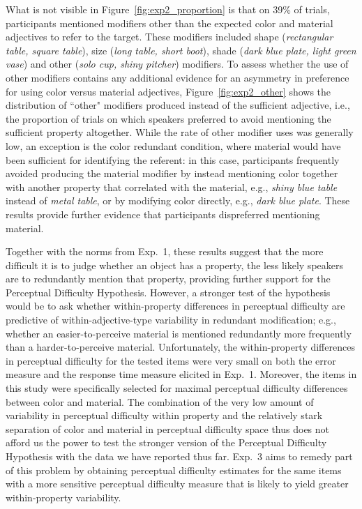 \documentclass[12pt,letterpaper]{article}
\begin{document}
What is not visible in Figure~\ref{fig:exp2_proportion} is that on 39\% of trials, participants mentioned  modifiers other than the expected color and material adjectives to refer to the target. These modifiers included shape (\textit{rectangular table, square table}), size (\textit{long table, short boot}), shade (\textit{dark blue plate, light green vase}) and other (\textit{solo cup, shiny pitcher}) modifiers. To assess whether the use of other modifiers contains any additional evidence for an asymmetry in preference for using color versus material adjectives, Figure~\ref{fig:exp2_other} shows the distribution of ``other" modifiers produced instead of the sufficient adjective, i.e., the proportion of trials on which speakers preferred to avoid mentioning the sufficient property altogether. While the rate of other modifier uses was generally low, an exception is the color redundant condition, where material would have been sufficient for identifying the referent: in this case, participants frequently avoided producing the material modifier by instead mentioning color together with another property that correlated with the material, e.g., \emph{shiny blue table} instead of \emph{metal table}, or by modifying color directly, e.g., \emph{dark blue plate}. These results provide further evidence that participants dispreferred mentioning material.


Together with the norms from Exp.~1, these results suggest that the more difficult it is to judge whether an object has a property, the less likely speakers are to redundantly mention that property, providing further  support for the Perceptual Difficulty Hypothesis. However, a stronger test of the hypothesis would be to ask whether within-property differences in perceptual difficulty are predictive of within-adjective-type variability in redundant modification; e.g., whether an easier-to-perceive material is mentioned redundantly more frequently than a harder-to-perceive material. Unfortunately, the within-property differences in perceptual difficulty for the tested items were very small on both the error measure and the response time measure elicited in Exp.~1. Moreover, the items in this study were specifically selected for maximal perceptual difficulty differences between color and material. The combination of the very low amount of variability in perceptual difficulty within property and the relatively stark separation of color and material in perceptual difficulty space thus does not afford us the power to test the stronger version of the Perceptual Difficulty Hypothesis with the data we have reported thus far. Exp.~3 aims to remedy part of this problem by obtaining perceptual difficulty estimates for the same items with a more sensitive perceptual difficulty measure that is likely to yield greater within-property variability.
\end{document}
